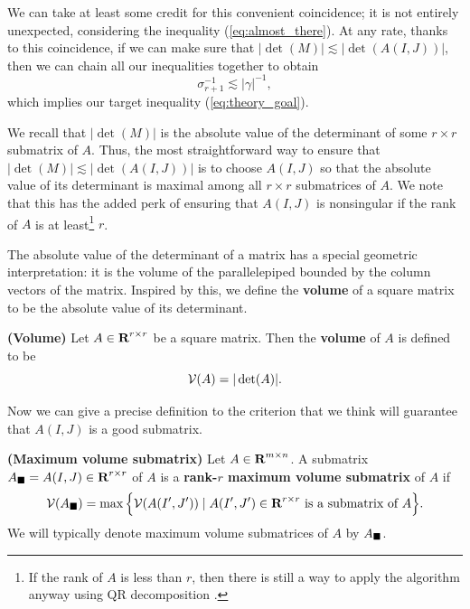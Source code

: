 \documentclass{article}
\begin{document}
	We can take at least some credit for this convenient coincidence; it is not entirely unexpected, considering the inequality (\ref{eq:almost_there}). At any rate, thanks to this coincidence, if we can make sure that $|\det(M)| \lesssim |\det(A(I,J))|$, then we can chain all our inequalities together to obtain
	\begin{equation}
		\sigma_{r+1}^{-1} \lesssim |\gamma|^{-1},
	\end{equation}
	which implies our target inequality (\ref{eq:theory_goal}).
	
	We recall that $|\det(M)|$ is the absolute value of the determinant of some $r\times r$ submatrix of $A$. Thus, the most straightforward way to ensure that $|\det(M)|\lesssim |\det(A(I,J))|$ is to choose $A(I,J)$ so that the absolute value of its determinant is maximal among all $r\times r$ submatrices of $A$.  We note that this has the added perk of ensuring that $A(I,J)$ is nonsingular if the rank of $A$ is at least\footnote{If the rank of $A$ is less than $r$, then there is still a way to apply the algorithm anyway using QR decomposition \cite{goreinov_2010}.} $r$.
	
	The absolute value of the determinant of a matrix has a special geometric interpretation: it is the volume of the parallelepiped bounded by the column vectors of the matrix. Inspired by this, we define the \textbf{volume} of a square matrix to be the absolute value of its determinant.
	
	\begin{dfn} \textnormal{\bf(Volume)}
		\label{def:volume}
		Let $A \in \textnormal{\bf R}^{r\times r}$ be a square matrix. Then the \textbf{volume} of $A$ is defined to be
		\begin{equation}
			\mathcal{V}(A) = |\det(A)|.
		\end{equation}
	\end{dfn}
	
	Now we can give a precise definition to the criterion that we think will guarantee that $A(I,J)$ is a good submatrix.
	
	\begin{dfn} \textnormal{\bf(Maximum volume submatrix)}
		\label{def:max_volume_submatrix}
		Let $A \in \textnormal{\bf R}^{m\times n}$. A submatrix $A_\blacksquare = A(I,J) \in \textnormal{\bf R}^{r\times r}$ of $A$ is a \textbf{rank-$r$ maximum volume submatrix} of $A$ if
		\begin{equation}
			\mathcal{V}(A_\blacksquare) = \max\Big\{\mathcal{V}(A(I', J')) \mid A(I',J') \in \textnormal{\bf R}^{r\times r} \textnormal{ is a submatrix of } A\Big\}.
		\end{equation}
		We will typically denote maximum volume submatrices of $A$ by $A_\blacksquare$.
	\end{dfn}
	
\end{document}
